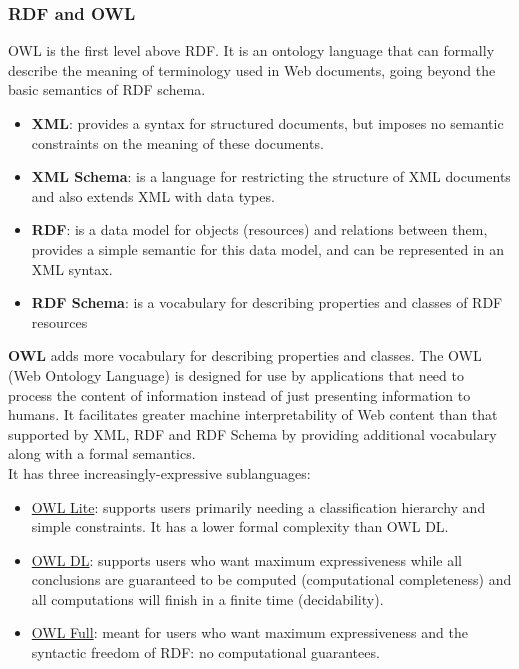 \documentclass[10pt,a4paper]{article}
\begin{document}
\subsubsection{RDF and OWL}
OWL is the first level above RDF. It is an ontology language that can formally describe the meaning of terminology used in Web documents, going beyond the basic semantics of RDF schema.
\begin{itemize}
	\item \textbf{XML}: provides a syntax for structured documents, but imposes no semantic constraints on the meaning of these documents.
	\item \textbf{XML Schema}: is a language for restricting the structure of XML documents and also extends XML with data types.
	\item \textbf{RDF}: is a data model for objects (resources) and relations between them, provides a simple semantic for this data model, and can be represented in an XML syntax.
	\item \textbf{RDF Schema}: is a vocabulary for describing properties and classes of RDF resources
\end{itemize}
\textbf{OWL} adds more vocabulary for describing properties and classes. The OWL (Web Ontology Language) is designed for use by applications that need to process the content of information instead of just presenting information to humans. It facilitates greater machine interpretability of Web content than that supported by XML, RDF and RDF Schema by providing additional vocabulary along with a formal semantics.\\
	It has three increasingly-expressive sublanguages:
	\begin{itemize}
		\item \uline{OWL Lite}: supports users primarily needing a classification hierarchy and simple constraints. It has a lower formal complexity than OWL DL.
		\item \uline{OWL DL}: supports users who want maximum expressiveness while all conclusions are guaranteed to be computed (computational completeness) and all computations will finish in a finite time (decidability).
		\item \uline{OWL Full}: meant for users who want maximum expressiveness and the syntactic freedom of RDF: no computational guarantees.
	\end{itemize}
\end{document}
